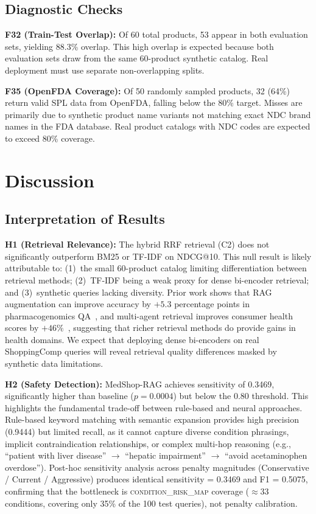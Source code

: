 \documentclass[conference]{IEEEtran}
\begin{document}
\subsection{Diagnostic Checks}

\textbf{F32 (Train-Test Overlap):} Of 60 total products, 53 appear in both
evaluation sets, yielding 88.3\% overlap. This high overlap is expected because
both evaluation sets draw from the same 60-product synthetic catalog. Real
deployment must use separate non-overlapping splits.

\textbf{F35 (OpenFDA Coverage):} Of 50 randomly sampled products, 32 (64\%)
return valid SPL data from OpenFDA, falling below the 80\% target. Misses are
primarily due to synthetic product name variants not matching exact NDC brand
names in the FDA database. Real product catalogs with NDC codes are expected to
exceed 80\% coverage.

\section{Discussion}
\label{sec:discussion}

\subsection{Interpretation of Results}

\textbf{H1 (Retrieval Relevance):} The hybrid RRF retrieval (C2) does not
significantly outperform BM25 or TF-IDF on NDCG@10. This null result is likely
attributable to: (1)~the small 60-product catalog limiting differentiation
between retrieval methods; (2)~TF-IDF being a weak proxy for dense bi-encoder
retrieval; and (3)~synthetic queries lacking diversity. Prior work shows that
RAG augmentation can improve accuracy by $+5.3$ percentage points in
pharmacogenomics QA~\cite{pgxrag}, and multi-agent retrieval improves consumer
health scores by $+46\%$~\cite{medagent}, suggesting that richer retrieval
methods do provide gains in health domains. We expect that deploying dense
bi-encoders on real ShoppingComp queries will reveal retrieval quality
differences masked by synthetic data limitations.

\textbf{H2 (Safety Detection):} MedShop-RAG achieves sensitivity of 0.3469,
significantly higher than baseline ($p{=}0.0004$) but below the 0.80 threshold.
This highlights the fundamental trade-off between rule-based and neural approaches.
Rule-based keyword matching with semantic expansion provides high precision
(0.9444) but limited recall, as it cannot capture diverse condition phrasings,
implicit contraindication relationships, or complex multi-hop reasoning (e.g.,
``patient with liver disease'' $\rightarrow$ ``hepatic impairment''
$\rightarrow$ ``avoid acetaminophen overdose''). Post-hoc sensitivity analysis
across penalty magnitudes (Conservative / Current / Aggressive) produces
identical sensitivity = 0.3469 and F1 = 0.5075, confirming that the bottleneck
is \textsc{condition\_risk\_map} coverage ($\approx 33$ conditions, covering only
35\% of the 100 test queries), not penalty calibration.
\end{document}
